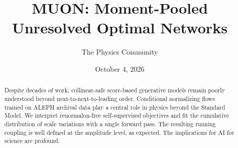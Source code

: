 \documentclass[11pt]{article}
\title{MUON: Moment-Pooled Unresolved Optimal Networks}
\author{The Physics Community}
\date{October 4, 2026}
\numberwithin{equation}{section}
\theoremstyle{definition}
\theoremstyle{remark}
\begin{document}
\maketitle
\begin{abstract}
Despite decades of work, collinear-safe score-based generative models
remain poorly understood beyond next-to-next-to-leading order.
Conditional normalizing flows trained on ALEPH archival data play a
central role in physics beyond the Standard Model. We interpret
renormalon-free self-supervised objectives and fit the cumulative
distribution of scale variations with a single forward pass. The
resulting running coupling is well defined at the amplitude level, as
expected. The implications for AI for science are profound.
\end{abstract}
\tableofcontents





\nocite{*}


\end{document}
